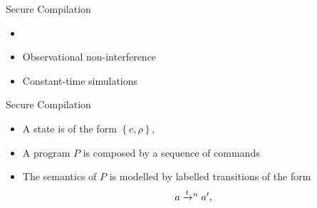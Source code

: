 
\begin{frame}{Secure Compilation}
\begin{itemize}
    \item<2-| alert@2> \cite{BartheSecure}
    
    \item<3-| alert@3> Observational non-interference
    \item<4-| alert@4> Constant-time simulations
\end{itemize}
\end{frame}

\begin{frame}{Secure Compilation}
\begin{itemize}
    \item<2-| alert@2-3> A state is of the form 
    $\left\{c, \rho\right\}$,
    
    \item<4-| alert@4> A program $P$ is composed by a sequence of
    commands
    
    \item<5-| alert@5-> The semantics of $P$ is modelled by
    labelled transitions of the form \[a \To*{t}{n} a',\]
\end{itemize}
\end{frame}

